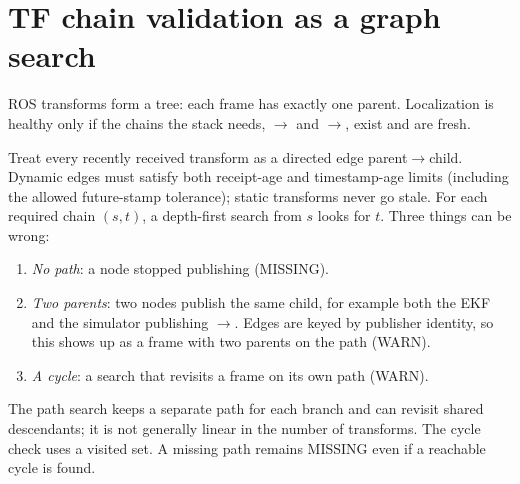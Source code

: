 \section{TF chain validation as a graph search}
\label{sec:tf}

ROS transforms form a tree: each frame has exactly one parent. Localization is
healthy only if the chains the stack needs, $\to$ and
$\to$, exist and are fresh.

Treat every recently received transform as a directed edge
parent$\to$child. Dynamic edges must satisfy both receipt-age and timestamp-age
limits (including the allowed future-stamp tolerance); static transforms never
go stale. For each required chain
$(s, t)$, a depth-first search from $s$ looks for $t$. Three things can be wrong:
\begin{enumerate}[nosep]
  \item \emph{No path}: a node stopped publishing (MISSING).
  \item \emph{Two parents}: two nodes publish the same child, for example both
        the EKF and the simulator publishing $\to$.
        Edges are keyed by publisher identity, so this shows up as a frame with
        two parents on the path (WARN).
  \item \emph{A cycle}: a search that revisits a frame on its own path (WARN).
\end{enumerate}
The path search keeps a separate path for each branch and can revisit shared
descendants; it is not generally linear in the number of transforms. The cycle
check uses a visited set. A missing path remains MISSING even if a reachable
cycle is found.

